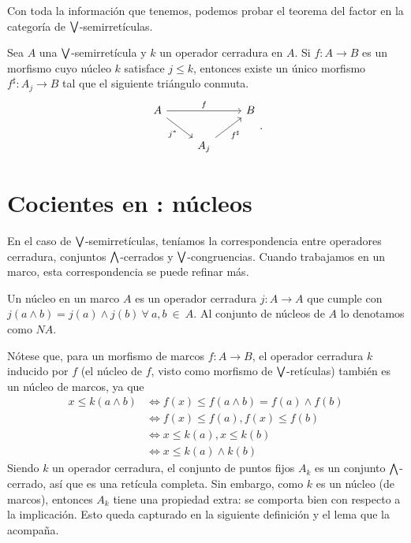 Con toda la información que tenemos,
podemos probar el teorema del factor
en la categoría de $\bigvee$-semirretículas.
\begin{theorem}
    Sea $A$ una $\bigvee$-semirretícula y $k$ un operador cerradura en $A$.
    Si $f:A\to B$ es un morfismo cuyo núcleo $k$ satisface $j\leq k$,
    entonces existe un único morfismo $f^\sharp:A_j\to B$ tal que
    el siguiente triángulo conmuta.
    \[
        \begin{tikzcd}
            A \ar[rr,"f"] \ar[dr,"j^*"'] &&  B \\
            &A_j \ar[ur,"f^\sharp"']
        \end{tikzcd}
    .\]
\end{theorem}
    

\section{Cocientes en : núcleos}
En el caso de $\bigvee$-semirretículas, teníamos la correspondencia
entre operadores cerradura, conjuntos $\bigwedge$-cerrados
y $\bigvee$-congruencias.
Cuando trabajamos en un marco, esta correspondencia se puede refinar
más.

\begin{definition}
\label{def:nucleo}
Un núcleo en un marco $A$ es un operador cerradura $j:A \to A$ que cumple con $j(a\wedge b)=j(a)\wedge j(b) \ \forall \ a,b \ \in \ A$.
Al conjunto de núcleos de $A$ lo denotamos como $NA$.
\end{definition}

Nótese que, para un morfismo de marcos $f: A\to B$, el operador
cerradura $k$ inducido por $f$ (el núcleo de $f$, visto como morfismo
de $\bigvee$-retículas) también es un núcleo de marcos, ya que
\begin{align*}
x\leq k(a\wedge b)&\iff f(x)\leq f(a\wedge b)=f(a)\wedge f(b)\\
&\iff f(x)\leq f(a) , f(x)\leq f(b) \\
&\iff x\leq k(a), x\leq k(b)\\
& \iff x\leq k(a)\wedge k(b)
\end{align*}
Siendo $k$ un operador cerradura, el conjunto de puntos fijos $A_k$ es
un conjunto $\bigwedge$-cerrado, así que es una retícula completa. Sin
embargo, como $k$ es un núcleo (de marcos), entonces $A_k$ tiene
una propiedad extra: se comporta bien con respecto a la implicación.
Esto queda capturado en la siguiente definición y el lema que la
acompaña.

